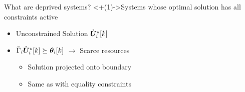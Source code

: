 \documentclass[aspectratio=169]{beamer}
\begin{document}
\begin{frame}{What are deprived systems?}{}
  \centering
  \onslide<+(1)->{Systems whose optimal solution has all constraints active}

  \begin{minipage}[t]{.55\linewidth}
    \begin{itemize}[<+(2)->]
      \item Unconstrained Solution $\mathring{\boldsymbol{U}}^{\star}_i[k]$
      \item $\bar{\Gamma}_{i}\optuncUik \succeq\thetaik$ $\to$ Scarce resources
            \begin{itemize}
              \item Solution projected onto boundary
              \item Same as with equality constraints\footnotemark

            \end{itemize}
    \end{itemize}


\end{minipage}
\end{frame}
\end{document}
